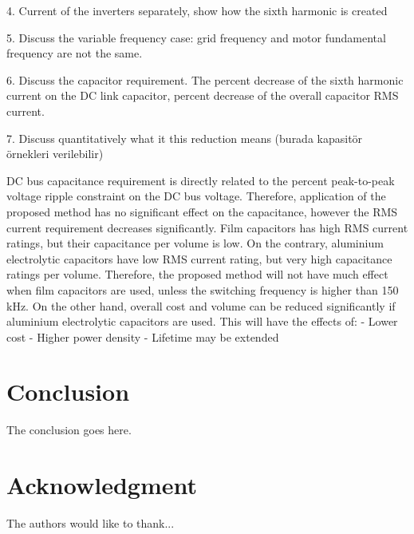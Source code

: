 \documentclass[conference,a4paper,twocolumn]{IEEEtran}
\begin{document}
4. Current of the inverters separately, show how the sixth harmonic is created

5. Discuss the variable frequency case: grid frequency and motor fundamental frequency are not the same.

6. Discuss the capacitor requirement. The percent decrease of the sixth harmonic current on the DC link capacitor, percent decrease of the overall capacitor RMS current.

7. Discuss quantitatively what it this reduction means (burada kapasitör örnekleri verilebilir)

DC bus capacitance requirement is directly related to the percent peak-to-peak voltage ripple constraint on the DC bus voltage. Therefore, application of the proposed method has no significant effect on the capacitance, however the RMS current requirement decreases significantly.
Film capacitors has high RMS current ratings, but their capacitance per volume is low. On the contrary, aluminium electrolytic capacitors have low RMS current rating, but very high capacitance ratings per volume. Therefore, the proposed method will not have much effect when film capacitors are used, unless the switching frequency is higher than 150 kHz. On the other hand, overall cost and volume can be reduced significantly if aluminium electrolytic capacitors are used.
This will have the effects of:
- Lower cost
- Higher power density
- Lifetime may be extended


\section{Conclusion}
The conclusion goes here.


\section*{Acknowledgment}

The authors would like to thank...



\end{document}
